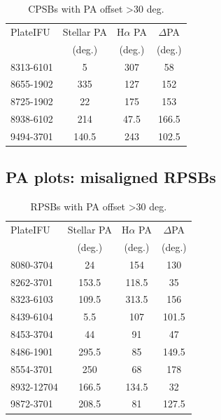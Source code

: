 \begin{table}
\caption{CPSBs with PA offset \textgreater 30 deg.}
\label{tab:offsetCPSBs}
\begin{tabular}{lccc}
\hline
PlateIFU  & Stellar PA & H$\alpha$ PA & $\Delta$PA \\
  & (deg.) & (deg.) & (deg.) \\
\hline
8313-6101 & 5 & 307 & 58 \\
8655-1902 & 335 & 127 & 152 \\
8725-1902 & 22 & 175 & 153 \\
8938-6102 & 214 & 47.5 & 166.5 \\
9494-3701 & 140.5 & 243 & 102.5 \\
\hline
\end{tabular}
\end{table}

\subsection{PA plots: misaligned RPSBs}

\begin{table}
\caption{RPSBs with PA offset \textgreater 30 deg.}
\label{tab:offsetRPSBs}
\begin{tabular}{lccc}
\hline
PlateIFU   & Stellar PA & H$\alpha$ PA & $\Delta$PA \\
  & (deg.) & (deg.) & (deg.) \\
\hline
8080-3704 & 24 & 154 & 130 \\
8262-3701 & 153.5 & 118.5 & 35 \\
8323-6103 & 109.5 & 313.5 & 156 \\
8439-6104 & 5.5 & 107 & 101.5 \\
8453-3704 & 44 & 91 & 47 \\
8486-1901 & 295.5 & 85 & 149.5 \\
8554-3701 & 250 & 68 & 178 \\
8932-12704 & 166.5 & 134.5 & 32 \\
9872-3701 & 208.5 & 81 & 127.5 \\
\hline
\end{tabular}
\end{table}

